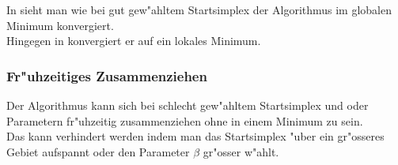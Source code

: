 In  sieht man wie bei gut gew"ahltem Startsimplex der Algorithmus im globalen Minimum konvergiert.\\
Hingegen in  konvergiert er auf ein lokales Minimum.


\subsubsection{Fr"uhzeitiges Zusammenziehen}
\label{sec:downhillZusammenziehen}
Der Algorithmus kann sich bei schlecht gew"ahltem Startsimplex und oder Parametern fr"uhzeitig zusammenziehen ohne in einem Minimum zu sein.\\
Das kann verhindert werden indem man das Startsimplex "uber ein gr"osseres Gebiet aufspannt oder den Parameter $\beta$ gr"osser w"ahlt.


